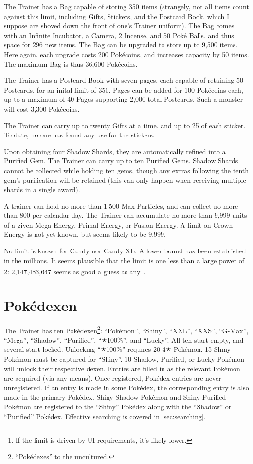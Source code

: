 The Trainer has a Bag capable of storing 350 items (strangely, not all items
  count against this limit, including Gifts, Stickers, and the Postcard Book,
  which I suppose are shoved down the front of one's Trainer uniform).
The Bag comes with an Infinite Incubator, a Camera, 2 Incense, and 50 Poké Balls,
  and thus space for 296 new items.
The Bag can be upgraded to store up to 9,500 items.
Here again, each upgrade costs 200 Pokécoins, and increases capacity by 50 items.
The maximum Bag is thus 36,600 Pokécoins.

The Trainer has a Postcard Book with seven pages, each capable of retaining
 50 Postcards, for an inital limit of 350.
Pages can be added for 100 Pokécoins each, up to a maximum of 40 Pages
 supporting 2,000 total Postcards.
Such a monster will cost 3,300 Pokécoins.

The Trainer can carry up to twenty Gifts at a time. and up to 25 of each sticker.
To date, no one has found any use for the stickers.

Upon obtaining four Shadow Shards, they are automatically refined into a Purified Gem.
The Trainer can carry up to ten Purified Gems.
Shadow Shards cannot be collected while holding ten gems, though any extras
 following the tenth gem's purification will be retained (this can only
 happen when receiving multiple shards in a single award).

A trainer can hold no more than 1,500 Max Particles, and can collect no more than 800 per calendar day.
The Trainer can accumulate no more than 9,999 units of a given Mega Energy,
 Primal Energy, or Fusion Energy.
A limit on Crown Energy is not yet known, but seems likely to be 9,999.

No limit is known for Candy nor Candy XL.
A lower bound has been established in the millions.
It seems plausible that the limit is one less than a large power of 2:
  2,147,483,647 seems as good a guess as any\footnote{If the limit is driven by UI requirements, it's likely lower.}.

\section{Pokédexen}
\label{sec:dexen}
The Trainer has ten Pokédexen\footnote{``Pokédexes'' to the uncultured.}:
  ``Pokémon'', ``Shiny'', ``XXL'', ``XXS'', ``G-Max'', ``Mega'', ``Shadow'',
  ``Purified'', ``🟉100\%'', and ``Lucky''.
All ten start empty, and several start locked.
Unlocking ``🟉100\%'' requires 20 4🟉 Pokémon.
15 Shiny Pokémon must be captured for ``Shiny''.
10 Shadow, Purified, or Lucky Pokémon will unlock their respective dexen.
Entries are filled in as the relevant Pokémon are acquired (via any means).
Once registered, Pokédex entries are never unregistered.
If an entry is made in some Pokédex, the corresponding entry is also made
  in the primary Pokédex.
Shiny Shadow Pokémon and Shiny Purified Pokémon are registered to the
  ``Shiny'' Pokédex along with the ``Shadow'' or ``Purified'' Pokédex.
Effective searching is covered in \autoref{sec:searching}.

